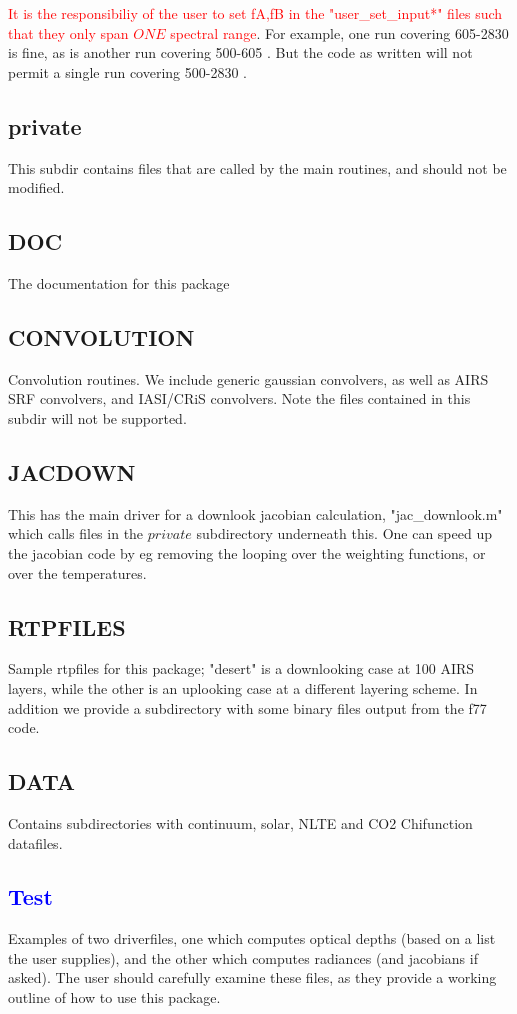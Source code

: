 \documentclass[12pt]{article}
\begin{document}
\textcolor{red}{It is the responsibiliy of the user to set fA,fB in 
the "user\_set\_input*" files such that they only span $ONE$ spectral
range}. For example, one run covering 605-2830 \wn is fine, as is 
another run covering 500-605 \wn. But the code as written will not permit
a single run covering 500-2830 \wn.

\subsection{private}
This subdir contains files that are called by the main routines, and should
not be modified.

\subsection{DOC}
The documentation for this package

\subsection{CONVOLUTION}
Convolution routines. We include generic gaussian convolvers, as well as AIRS
SRF convolvers, and IASI/CRiS convolvers. Note the files contained in this 
subdir will not be supported.

\subsection{JACDOWN}
This has the main driver for a downlook jacobian calculation, "jac\_downlook.m"
which calls files in the $private$ subdirectory underneath this. One can speed
up the jacobian code by eg removing the looping over the weighting functions, 
or over the temperatures.

\subsection{RTPFILES}
Sample rtpfiles for this package; "desert" is a downlooking case at 100 AIRS
layers, while the other is an uplooking case at a different layering scheme.
In addition we provide a subdirectory with some binary files output from
the f77 code.

\subsection{DATA}
Contains subdirectories with continuum, solar, NLTE and CO2 Chifunction 
datafiles.

\subsection{\textcolor{blue}{Test}}
Examples of two driverfiles, one which computes optical depths (based on a 
list the user supplies), and the other which computes radiances (and 
jacobians if asked). The user should carefully examine these files, as they
provide a working outline of how to use this package.
\end{document}
